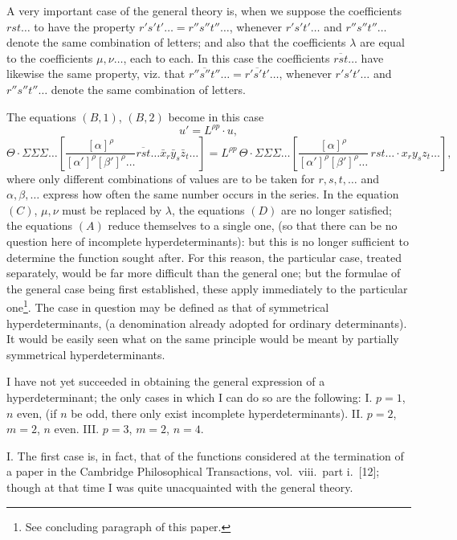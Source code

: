 \documentclass[11pt]{article}
\begin{document}
A very important case of the general theory is, when we suppose the coefficients
$rst\ldots$ to have the property $r's't'\ldots = r''s''t''\ldots$, whenever $r's't'\ldots$ and $r''s''t''\ldots$ denote
the same combination of letters; and also that the coefficients $\lambda$ are equal to the
coefficients $\mu, \nu \ldots$, each to each. In this case the coefficients $\overline{rst}\ldots$ have likewise
the same property, viz. that $\overline{r''s''t''}\ldots = \overline{r's't'}\ldots$, whenever $r's't'\ldots$ and $r''s''t''\ldots$ denote
the same combination of letters.

The equations $(B, 1)$, $(B, 2)$ become in this case
\[
u' = L^{\rho p}\cdot u \tag{B, 3},
\]
\[
\Theta\cdot\Sigma\Sigma\Sigma\ldots\left[\frac{[\alpha]^\rho}{[\alpha']^\rho [\beta']^\rho \ldots}\overline{rst}\ldots \bar{x}_r \bar{y}_s \bar{z}_t \ldots\right] = L^{\rho p}\,\Theta\cdot\Sigma\Sigma\Sigma\ldots\left[\frac{[\alpha]^\rho}{[\alpha']^\rho [\beta']^\rho \ldots}\,rst\ldots \cdot x_r y_s z_t \ldots\right] \tag{B, 4},
\]
where only different combinations of values are to be taken for $r, s, t, \ldots$ and
$\alpha, \beta, \ldots$ express how often the same number occurs in the series. In the equation
$(C)$, $\mu, \nu$ must be replaced by $\lambda$, the equations $(D)$ are no longer satisfied; the
equations $(A)$ reduce themselves to a single one, (so that there can be no question
here of incomplete hyperdeterminants): but this is no longer sufficient to determine
the function sought after. For this reason, the particular case, treated separately,
would be far more difficult than the general one; but the formulae of the general case
being first established, these apply immediately to the particular one\footnote{See concluding paragraph of this paper.}. The case in
question may be defined as that of symmetrical hyperdeterminants, (a denomination
already adopted for ordinary determinants). It would be easily seen what on the same
principle would be meant by partially symmetrical hyperdeterminants.

I have not yet succeeded in obtaining the general expression of a hyperdeterminant;
the only cases in which I can do so are the following: I. $p=1$, $n$ even, (if $n$ be odd,
there only exist incomplete hyperdeterminants). II. $p=2$, $m=2$, $n$ even. III. $p=3$,
$m=2$, $n=4$.

I. The first case is, in fact, that of the functions considered at the termination of
a paper in the Cambridge Philosophical Transactions, vol.~viii.~part i.~[12]; though at
that time I was quite unacquainted with the general theory.
\end{document}
